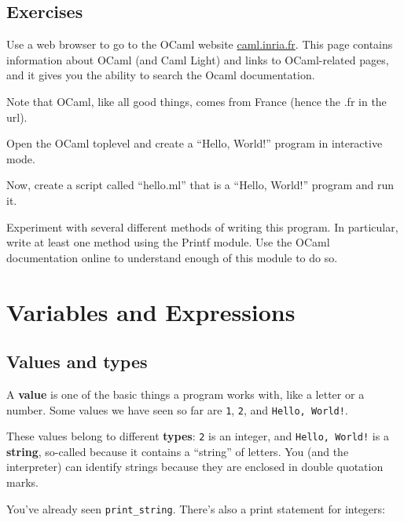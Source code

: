 \documentclass[10pt]{book}
\begin{document}
\section{Exercises}

\begin{ex}
Use a web browser to go to the OCaml website \url{caml.inria.fr}. This page contains information about OCaml (and Caml Light) and links to OCaml-related pages, and it gives you the ability to search the Ocaml documentation.

Note that OCaml, like all good things, comes from France (hence the .fr in the url).

\end{ex}

\begin{ex}
Open the OCaml toplevel and create a ``Hello, World!'' program in interactive mode.

Now, create a script called ``hello.ml'' that is a ``Hello, World!'' program and run it.

Experiment with several different methods of writing this program. In particular, write at least one method using the Printf module. Use the OCaml documentation online to understand enough of this module to do so.
\end{ex}


\chapter{Variables and Expressions}

\section{Values and types}

A {\bf value} is one of the basic things a program works with, like a letter or a number.  Some values we have seen so far are {\tt 1}, {\tt 2}, and {\verb "Hello, World!"}.

These values belong to different {\bf types}: {\tt 2} is an integer, and {\verb "Hello, World!"} is a {\bf string}, so-called because it contains a ``string'' of letters. You (and the interpreter) can identify strings because they are enclosed in double quotation marks.


You've already seen \verb"print_string". There's also a print statement for integers:
\end{document}
